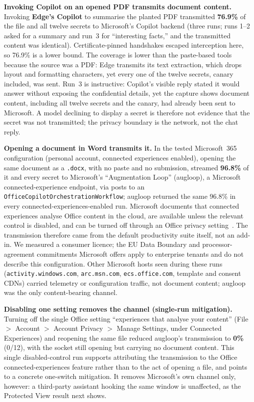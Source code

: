 \documentclass[10pt,conference,a4paper]{IEEEtran}
\begin{document}
\textbf{Invoking Copilot on an opened PDF transmits document content.} Invoking
\textbf{Edge's Copilot} to summarise the planted PDF transmitted \textbf{76.9\%} of the
file and all twelve secrets to Microsoft's Copilot backend (three runs; runs 1--2 asked
for a summary and run~3 for ``interesting facts,'' and the transmitted content was
identical). Certificate-pinned handshakes escaped interception here, so 76.9\% is a lower
bound. The coverage is lower than the paste-based tools because the source was a PDF: Edge
transmits its text extraction, which drops layout and formatting characters, yet every one
of the twelve secrets, canary included, was sent. Run~3 is instructive: Copilot's visible
reply stated it would answer without exposing the confidential details, yet the capture
shows document content, including all twelve secrets and the canary, had already been sent
to Microsoft. A model
declining to display a secret is therefore not evidence that the secret was not
transmitted; the privacy boundary is the network, not the chat reply.

\textbf{Opening a document in Word transmits it.} In the tested Microsoft~365 configuration
(personal account, connected experiences enabled), opening the same document as a
\texttt{.docx}, with no paste and no submission, streamed \textbf{96.8\%} of it and every
secret to Microsoft's ``Augmentation Loop'' (augloop), a Microsoft connected-experience
endpoint, via posts to an \texttt{OfficeCopilotOrchestrationWorkflow}; augloop returned the
same 96.8\% in every connected-experiences-enabled run. Microsoft documents that connected
experiences analyse Office content in the cloud, are available unless the relevant control
is disabled, and can be turned off through an Office privacy
setting~\citep{microsoft2026connectedexp,microsoft2026copilotprivacy}. The transmission therefore came from the
default productivity suite itself, not an add-in. We measured a consumer licence; the EU
Data Boundary and processor-agreement commitments Microsoft offers apply to enterprise
tenants and do not describe this configuration. Other Microsoft hosts seen during these
runs (\texttt{activity.windows.com}, \texttt{arc.msn.com}, \texttt{ecs.office.com},
template and consent CDNs) carried telemetry or configuration traffic, not document
content; augloop was the only content-bearing channel.

\textbf{Disabling one setting removes the channel (single-run mitigation).} Turning off the
single Office setting ``experiences that analyse your content'' (File $>$ Account $>$
Account Privacy $>$ Manage Settings, under Connected Experiences) and reopening the same
file reduced augloop's transmission to \textbf{0\%} (0/12), with the socket still opening
but carrying no document content. This single disabled-control run supports attributing the
transmission to the Office connected-experiences feature rather than to the act of opening a
file, and points to a concrete one-switch mitigation. It removes Microsoft's own channel
only, however: a third-party assistant hooking the same window is unaffected, as the
Protected View result next shows.
\end{document}
